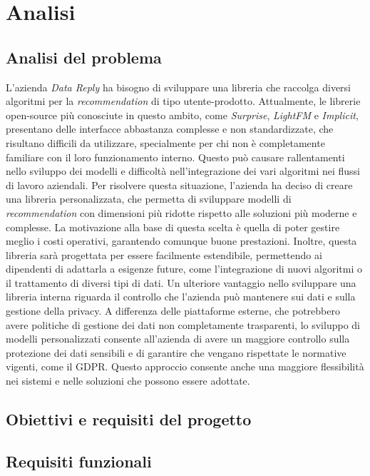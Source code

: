 \chapter{Analisi}

\section{Analisi del problema}

L'azienda \textit{Data Reply} ha bisogno di sviluppare una libreria che raccolga diversi algoritmi per la \textit{recommendation} di tipo utente-prodotto. Attualmente, le librerie open-source più conosciute in questo ambito, come \textit{Surprise}, \textit{LightFM} e \textit{Implicit}, presentano delle interfacce abbastanza complesse e non standardizzate, che risultano difficili da utilizzare, specialmente per chi non è completamente familiare con il loro funzionamento interno. Questo può causare rallentamenti nello sviluppo dei modelli e difficoltà nell'integrazione dei vari algoritmi nei flussi di lavoro aziendali. Per risolvere questa situazione, l'azienda ha deciso di creare una libreria personalizzata, che permetta di sviluppare modelli di \textit{recommendation} con dimensioni più ridotte rispetto alle soluzioni più moderne e complesse. La motivazione alla base di questa scelta è quella di poter gestire meglio i costi operativi, garantendo comunque buone prestazioni. Inoltre, questa libreria sarà progettata per essere facilmente estendibile, permettendo ai dipendenti di adattarla a esigenze future, come l'integrazione di nuovi algoritmi o il trattamento di diversi tipi di dati. Un ulteriore vantaggio nello sviluppare una libreria interna riguarda il controllo che l'azienda può mantenere sui dati e sulla gestione della privacy. A differenza delle piattaforme esterne, che potrebbero avere politiche di gestione dei dati non completamente trasparenti, lo sviluppo di modelli personalizzati consente all'azienda di avere un maggiore controllo sulla protezione dei dati sensibili e di garantire che vengano rispettate le normative vigenti, come il GDPR. Questo approccio consente anche una maggiore flessibilità nei sistemi e nelle soluzioni che possono essere adottate.

\section{Obiettivi e requisiti del progetto}

\section{Requisiti funzionali}

